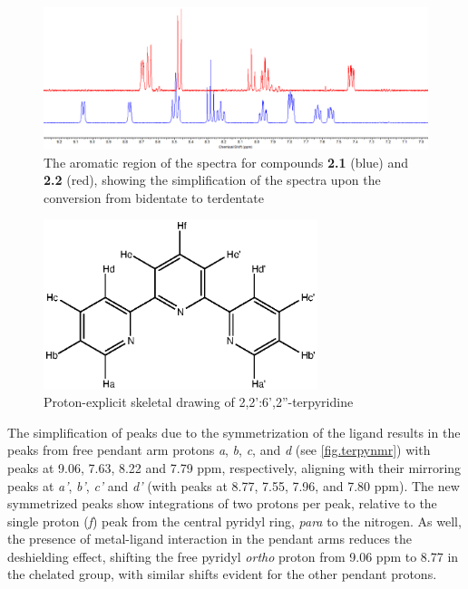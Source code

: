 \begin{figure}[!htb]
 \begin{center}
  \includegraphics[clip=true, width=\textwidth, keepaspectratio]{images/bidternmr.eps}
 \end{center}
\caption[The aromatic region of the \texorpdfstring{}{1H}  spectra showing bidentate - terdentate conversion]{The aromatic region of the \texorpdfstring{}{1H}  spectra for compounds \textbf{2.1} (blue) and \textbf{2.2} (red), showing the simplification of the spectra upon the conversion from bidentate to terdentate}
\label{fig.bidtoter}
\end{figure} 

\begin{figure}[!htb]
 \begin{center}
  \includegraphics[clip=true, width=80mm, keepaspectratio]{images/expandedterpyridine.eps}
 \end{center}
\caption[Proton-explicit skeletal drawing of 2,2':6',2''-terpyridine]{Proton-explicit skeletal drawing of 2,2':6',2''-terpyridine}
\label{fig.terpynmr}
\end{figure} 

The simplification of peaks due to the symmetrization of the ligand results in the peaks from free pendant arm protons \textit{a}, \textit{b}, \textit{c}, and \textit{d} (see \autoref{fig.terpynmr}) with peaks at 9.06, 7.63, 8.22 and 7.79 ppm, respectively, aligning with their mirroring peaks at \textit{a'}, \textit{b'}, \textit{c'} and \textit{d'} (with peaks at 8.77, 7.55, 7.96, and 7.80 ppm). The new symmetrized peaks show integrations of two protons per peak, relative to the single proton (\textit{f}) peak from the central pyridyl ring, \textit{para} to the nitrogen. As well, the presence of metal-ligand interaction in the pendant arms reduces the deshielding effect, shifting the free pyridyl \textit{ortho} proton from 9.06 ppm to 8.77 in the chelated group, with similar shifts evident for the other pendant protons.

